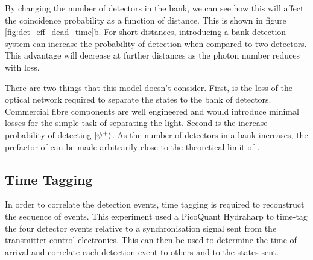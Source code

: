 By changing the number of detectors in the bank, we can see how this will affect the coincidence probability as a function of distance. This is shown in figure \ref{fig:det_eff_dead_time}b. For short distances, introducing a bank detection system can increase the probability of detection when compared to two detectors. This advantage will decrease at further distances as the photon number reduces with loss.

There are two things that this model doesn't consider. First, is the loss of the optical network required to separate the states to the bank of detectors. Commercial fibre components are well engineered and would introduce minimal losses for the simple task of separating the light. Second is the increase probability of detecting $\ket{\psi^+}$. As the number of detectors in a bank increases, the prefactor of  can be made arbitrarily close to the theoretical limit of .


%


\subsection{Time Tagging}

In order to correlate the detection events, time tagging is required to reconstruct the sequence of events. This experiment used a PicoQuant Hydraharp to time-tag the four detector events relative to a synchronisation signal sent from the transmitter control electronics. This can then be used to determine the time of arrival and correlate each detection event to others and to the states sent.

